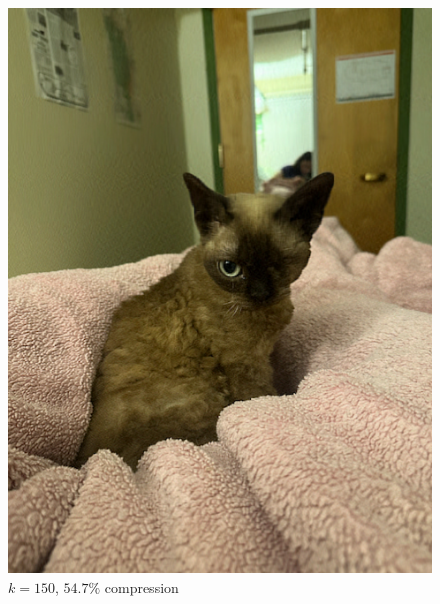\begin{figure}[H]
\begin{minipage}[b]{0.4\textwidth}
    \includegraphics[width=\textwidth]{images/compressed_cat_150.png}
    \caption{$k = 150$, $54.7\%$ compression}
  \end{minipage}
\end{figure}

